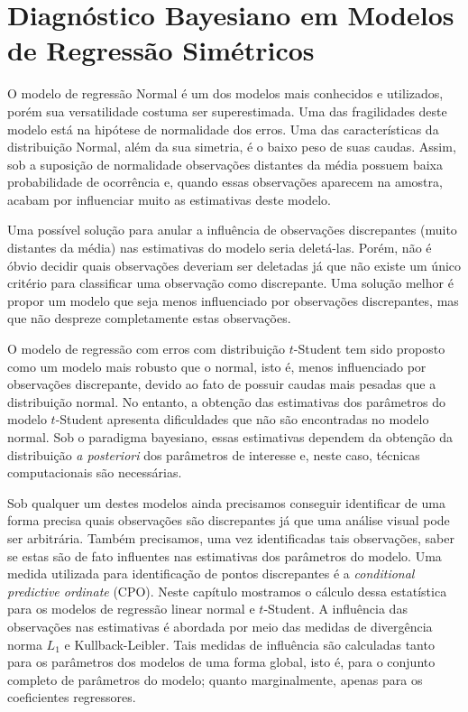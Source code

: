 \chapter{Diagnóstico Bayesiano em Modelos de Regressão Simétricos}
\label{cap:simetrico}

O modelo de regressão Normal é um dos modelos mais conhecidos e utilizados, porém sua versatilidade costuma ser superestimada. Uma das fragilidades deste modelo está na hipótese de normalidade dos erros. Uma das características da distribuição Normal, além da sua simetria, é o baixo peso de suas caudas. Assim, sob a suposição de normalidade observações distantes da média possuem baixa probabilidade de ocorrência e, quando essas observações aparecem na amostra, acabam por influenciar muito as estimativas deste modelo. 

Uma possível solução para anular a influência de observações discrepantes (muito distantes da média) nas estimativas do modelo seria deletá-las. Porém, não é óbvio decidir quais observações deveriam ser deletadas já que não existe um único critério para classificar uma observação como discrepante. Uma solução melhor é propor um modelo que seja menos influenciado por observações discrepantes, mas que não despreze completamente estas observações.

O modelo de regressão com erros com distribuição $t$-Student tem sido proposto como um modelo mais robusto que o normal, isto é, menos influenciado por observações discrepante, devido ao fato de possuir caudas mais pesadas que a distribuição normal. No entanto, a obtenção das estimativas dos parâmetros do modelo $t$-Student apresenta dificuldades que não são encontradas no modelo normal. Sob o paradigma bayesiano, essas estimativas dependem da obtenção da distribuição \textit{a posteriori} dos parâmetros de interesse e, neste caso, técnicas computacionais são necessárias.

Sob qualquer um destes modelos ainda precisamos conseguir identificar de uma forma precisa quais observações são discrepantes já que uma análise visual pode ser arbitrária. Também precisamos, uma vez identificadas tais observações, saber se estas são de fato influentes nas estimativas dos parâmetros do modelo. Uma medida utilizada para identificação de pontos discrepantes é a \textit{conditional predictive ordinate} (CPO). Neste capítulo mostramos o cálculo dessa estatística para os modelos de regressão linear normal e $t$-Student. A influência das observações nas estimativas é abordada por meio das medidas de divergência norma $L_1$ e Kullback-Leibler. Tais medidas de influência são calculadas tanto para os parâmetros dos modelos de uma forma global, isto é, para o conjunto completo de parâmetros do modelo; quanto marginalmente, apenas para os coeficientes regressores.

